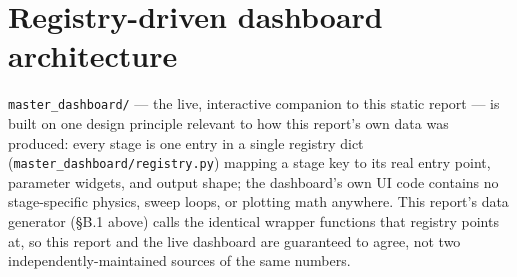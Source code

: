 \section{Registry-driven dashboard architecture}

\texttt{master\_dashboard/} --- the live, interactive companion to this static report
--- is built on one design principle relevant to how this report's own data was
produced: every stage is one entry in a single registry dict
(\texttt{master\_dashboard/registry.py}) mapping a stage key to its real entry point,
parameter widgets, and output shape; the dashboard's own UI code contains no
stage-specific physics, sweep loops, or plotting math anywhere. This report's data
generator (\S B.1 above) calls the identical wrapper functions that registry points
at, so this report and the live dashboard are guaranteed to agree, not two
independently-maintained sources of the same numbers.
